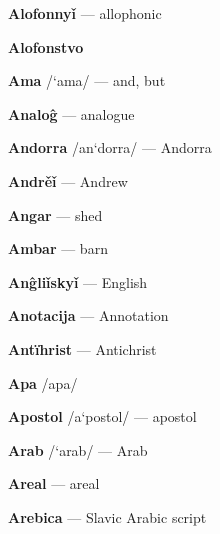 \textbf{Alofonnyǐ} — allophonic

\textbf{Alofonstvo}

\textbf{Ama} /`ama/ — and, but

\textbf{Analoĝ} — analogue

\textbf{Andorra} /an`dorra/ — Andorra

\textbf{Andrěǐ}  — Andrew

\textbf{Angar}  — shed

\textbf{Ambar}  — barn

\textbf{Anĝliǐskyǐ} — English

\textbf{Anotacija} — Annotation

\textbf{Antïhrist}  — Antichrist

\textbf{Apa} /apa/

\textbf{Apostol} /a`postol/ — apostol

\textbf{Arab} /`arab/ — Arab

\textbf{Areal} — areal

\textbf{Arebica} — Slavic Arabic script